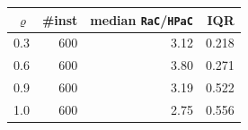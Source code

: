 \begin{tabular}{@{}rrrr@{}}
\toprule
$\varrho$ & \#inst & median \texttt{RaC}/\texttt{HPaC} & IQR \\
\midrule
0.3 & 600 & 3.12 & 0.218 \\
0.6 & 600 & 3.80 & 0.271 \\
0.9 & 600 & 3.19 & 0.522 \\
1.0 & 600 & 2.75 & 0.556 \\
\bottomrule
\end{tabular}
